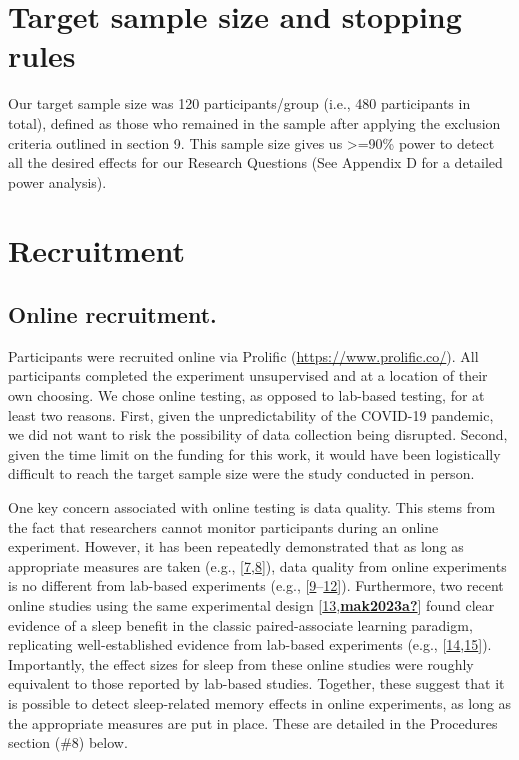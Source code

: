 \documentclass[
]{article}
\begin{document}
\hypertarget{target-sample-size-and-stopping-rules}{%
\section{Target sample size and stopping rules}\label{target-sample-size-and-stopping-rules}}

Our target sample size was 120 participants/group (i.e., 480 participants in total), defined as those who remained in the sample after applying the exclusion criteria outlined in section 9. This sample size gives us \textgreater=90\% power to detect all the desired effects for our Research Questions (See Appendix D for a detailed power analysis).

\hypertarget{recruitment}{%
\section{Recruitment}\label{recruitment}}

\hypertarget{online-recruitment.}{%
\subsection{Online recruitment.}\label{online-recruitment.}}

Participants were recruited online via Prolific (\url{https://www.prolific.co/}). All participants completed the experiment unsupervised and at a location of their own choosing. We chose online testing, as opposed to lab-based testing, for at least two reasons. First, given the unpredictability of the COVID-19 pandemic, we did not want to risk the possibility of data collection being disrupted. Second, given the time limit on the funding for this work, it would have been logistically difficult to reach the target sample size were the study conducted in person.

One key concern associated with online testing is data quality. This stems from the fact that researchers cannot monitor participants during an online experiment. However, it has been repeatedly demonstrated that as long as appropriate measures are taken (e.g., {[}\protect\hyperlink{ref-rodd2019a}{7},\protect\hyperlink{ref-curtis2022a}{8}{]}), data quality from online experiments is no different from lab-based experiments (e.g., {[}\protect\hyperlink{ref-anwyl-irvine2020a}{9}--\protect\hyperlink{ref-mak2021b}{12}{]}). Furthermore, two recent online studies using the same experimental design {[}\protect\hyperlink{ref-ashton2021a}{13},\protect\hyperlink{ref-mak2023a}{\textbf{mak2023a?}}{]} found clear evidence of a sleep benefit in the classic paired-associate learning paradigm, replicating well-established evidence from lab-based experiments (e.g., {[}\protect\hyperlink{ref-lo2014a}{14},\protect\hyperlink{ref-plihal1997a}{15}{]}). Importantly, the effect sizes for sleep from these online studies were roughly equivalent to those reported by lab-based studies. Together, these suggest that it is possible to detect sleep-related memory effects in online experiments, as long as the appropriate measures are put in place. These are detailed in the Procedures section (\#8) below.
\end{document}
